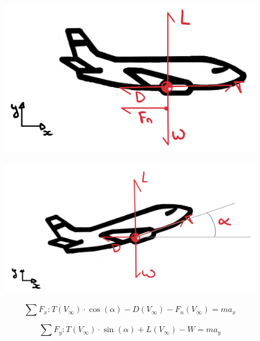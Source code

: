 \begin{figure}[!ht]
    \centering
    \begin{minipage}{.48\textwidth}
      \centering
      \includegraphics[width=\linewidth]{figures/schematic_groundphase.png}
      \label{fig:groundphase_schematic}
    \end{minipage}%
    \hfill
    \begin{minipage}{.48\textwidth}
      \centering
      \includegraphics[width=\linewidth]{figures/schematic_airbornephase.png}
      \label{fig:airbornephase_schematic}
    \end{minipage}
\end{figure}

\begin{equation}
    \label{eq:equillibrium_forcex}
    \sum F_x: T(V_\infty)\cdot \cos{(\alpha)} - D(V_\infty) - F_n(V_\infty) = m a_x
\end{equation}

\begin{equation}
    \label{eq:equillibrium_forcey}
    \sum F_y: T(V_\infty)\cdot \sin{(\alpha)} + L(V_\infty) - W = m a_y
\end{equation}

